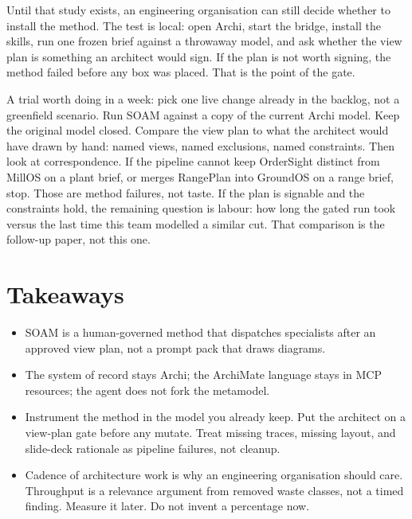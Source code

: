 \documentclass[10pt,journal,compsoc]{IEEEtran}
\begin{document}
Until that study exists, an engineering organisation can still decide whether to install the method. The test is local: open Archi, start the bridge, install the skills, run one frozen brief against a throwaway model, and ask whether the view plan is something an architect would sign. If the plan is not worth signing, the method failed before any box was placed. That is the point of the gate.

A trial worth doing in a week: pick one live change already in the backlog, not a greenfield scenario. Run SOAM against a copy of the current Archi model. Keep the original model closed. Compare the view plan to what the architect would have drawn by hand: named views, named exclusions, named constraints. Then look at correspondence. If the pipeline cannot keep OrderSight distinct from MillOS on a plant brief, or merges RangePlan into GroundOS on a range brief, stop. Those are method failures, not taste. If the plan is signable and the constraints hold, the remaining question is labour: how long the gated run took versus the last time this team modelled a similar cut. That comparison is the follow-up paper, not this one.

\section{Takeaways}
\label{sec:takeaways}

\begin{itemize}
\item SOAM is a human-governed method that dispatches specialists after an approved view plan, not a prompt pack that draws diagrams.
\item The system of record stays Archi; the ArchiMate language stays in MCP resources; the agent does not fork the metamodel.
\item Instrument the method in the model you already keep. Put the architect on a view-plan gate before any mutate. Treat missing traces, missing layout, and slide-deck rationale as pipeline failures, not cleanup.
\item Cadence of architecture work is why an engineering organisation should care. Throughput is a relevance argument from removed waste classes, not a timed finding. Measure it later. Do not invent a percentage now.
\end{itemize}



\end{document}
